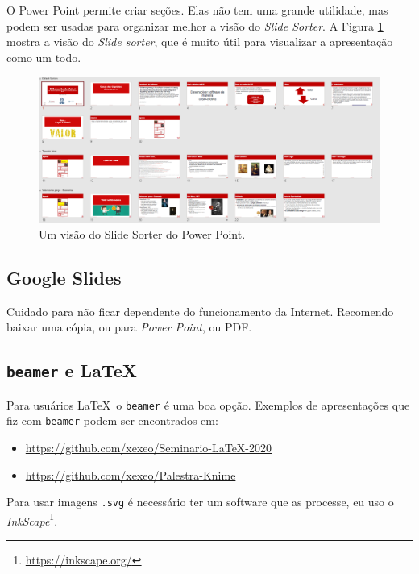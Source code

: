 O Power Point permite criar seções. Elas não tem uma grande utilidade, mas podem ser usadas para organizar melhor a visão do \textit{Slide Sorter}. A Figura \ref{fig:sorter} mostra a visão do \textit{Slide sorter}, que é muito útil para visualizar a apresentação como um todo.

\begin{figure}[tbh]
    \centering
    \includegraphics[width=\tam\linewidth]{imagens/slidesorter}
    \caption{Um visão do Slide Sorter do Power Point.}
    \label{fig:sorter}
\end{figure}



\subsection{Google Slides}

Cuidado para não ficar dependente do funcionamento da Internet. Recomendo baixar uma cópia, ou para \textit{Power Point}, ou PDF.

\subsection{\texttt{beamer} e \LaTeX}

Para usuários \LaTeX\ o \texttt{beamer} é uma boa opção. Exemplos de apresentações que fiz com \texttt{beamer} podem ser encontrados em:
\begin{itemize}
    \item \url{https://github.com/xexeo/Seminario-LaTeX-2020}
    \item \url{https://github.com/xexeo/Palestra-Knime}
\end{itemize}

Para usar imagens \texttt{.svg} é necessário ter um software que as processe, eu uso o \textit{InkScape}\footnote{\url{https://inkscape.org/}}.






